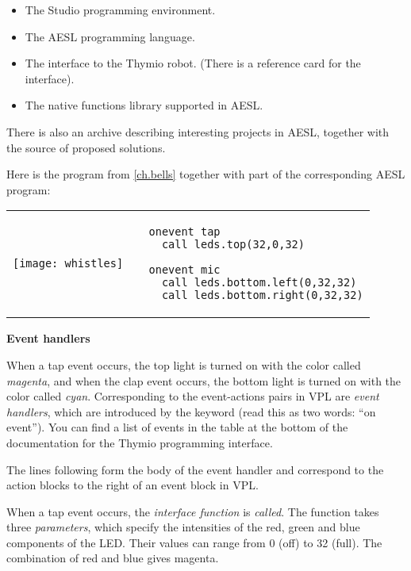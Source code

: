 \begin{itemize}
\item The Studio programming environment.
\item The AESL programming language.
\item The interface to the Thymio robot.
(There is a reference card for the interface).
\item The native functions library supported in AESL.
\end{itemize}

There is also an archive describing interesting projects in AESL,
together with the source of proposed solutions.


Here is the program  from \cref{ch.bells} together with
part of the corresponding AESL program:
 
\begin{center}
\begin{tabular}{ll}
\texttt{[image: whistles]} &
\begin{minipage}[b]{.5\textwidth}
\begin{footnotesize}
\begin{verbatim}
  onevent tap
    call leds.top(32,0,32)
  
  onevent mic
    call leds.bottom.left(0,32,32)
    call leds.bottom.right(0,32,32)
\end{verbatim}
\end{footnotesize}
\vspace*{8ex}
\end{minipage}
\end{tabular}
\end{center}

\textbf{\large Event handlers}

When a tap event occurs, the top light is turned on with the color
called \emph{magenta}, and when the clap event occurs, the bottom light
is turned on with the color called \emph{cyan}. Corresponding to the
event-actions pairs in VPL are \emph{event handlers}, which are
introduced by the keyword  (read this as two words: ``on
event''). You can find a list of events in the table at the bottom of
the documentation for the Thymio programming interface.

The lines following  form the body of the event handler
and correspond to the action blocks to the right of an event block in VPL.

When a tap event occurs, the \emph{interface function}  is
\emph{called}. The function takes three \emph{parameters}, which specify
the intensities of the red, green and blue components of the LED.
Their values can range from 0 (off) to 32 (full). The combination of red
and blue gives magenta.

